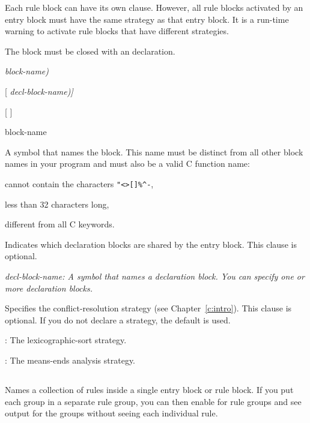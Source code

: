 {{Each rule block can have its own  clause. However, all rule
blocks activated by an entry block must have the same strategy as that
entry block. It is a run-time warning to activate rule blocks that
have different strategies.

The block must be closed with an  declaration.

\Format

 \it{block-name}\co)

[ \it{decl-block-name}\co)]

[ \co{)}]

\begin{argument}
\item[block-name]

A symbol that names the block. This name must be distinct
from all other block names in your program and must also be a
valid C function name:

cannot contain the characters \verb|"<>[]%^-|,

less than 32 characters long,

different from all C keywords.
\end{argument}

\Clauses


Indicates which declaration blocks are shared by the entry block. This
clause is optional.

\it{decl-block-name}: A symbol that names a declaration block.  You
can specify one or more declaration blocks.


Specifies the conflict-resolution strategy (see
Chapter~\ref{c:intro}).  This clause is optional. If you do not
declare a strategy, the default  is used.

: The lexicographic-sort strategy.

: The means-ends analysis strategy.

\subsection{}

Names a collection of rules inside a single entry block or rule
block. If you put each  group in a separate rule group, you
can then enable  for rule groups and see output for the
 groups without seeing each individual rule.

}}
